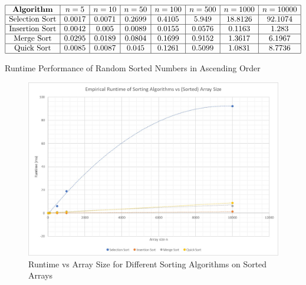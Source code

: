 \documentclass[12pt]{article}
\begin{document}
\begin{center}
\begin{table}[H]
$$\begin{array}{|c|c|c|c|c|c|c|c|}\hline
\textbf{Algorithm} & n=5 & n=10 & n=50 & n=100 & n=500 & n=1000 & n=10000 \\ \hline
\text{Selection Sort}& 0.0017 & 0.0071 & 0.2699 & 0.4105 & 5.949 & 18.8126 & 92.1074 \\ \hline
\text{Insertion Sort}& 0.0042 & 0.005 & 0.0089 & 0.0155 & 0.0576 & 0.1163 & 1.283 \\ \hline
\text{Merge Sort} & 0.0295 & 0.0189 & 0.0804 & 0.1699 & 0.9152 & 1.3617 & 6.1967 \\ \hline
\text{Quick Sort} & 0.0085 & 0.0087 & 0.045 & 0.1261 & 0.5099 & 1.0831 & 8.7736 \\ \hline
\end{array}$$
\caption{Runtime Performance of Random Sorted Numbers in Ascending Order}
\label{table:ascending}
\end{table}

\begin{center}
\begin{figure}[H]
\hfill\includegraphics[scale=0.8]{sorted.jpg}
\hspace*{\fill}
\caption{Runtime vs Array Size for Different Sorting Algorithms on Sorted Arrays}
\label{fig:sorted}
\end{figure}
\end{center}


\end{center}
\end{document}
